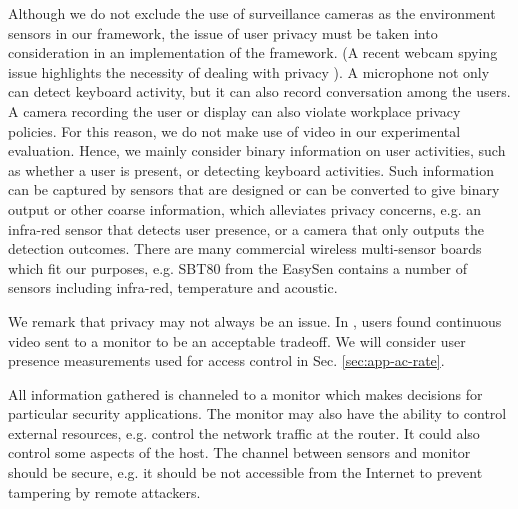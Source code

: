 Although we do not exclude the use of surveillance cameras as the
environment sensors in our framework, the issue of user privacy must
be taken into consideration in an implementation of the framework.
(A recent webcam spying issue highlights the necessity of dealing
with privacy \cite{webcam-spying}).
A microphone not only can detect keyboard activity, but it can also
record conversation among the users. A camera recording the user or
display can also violate workplace privacy policies.
For this reason,
we do not make use of video in our experimental evaluation.
Hence, we mainly consider binary information on user activities, such as
whether a user is present, or detecting keyboard activities.
Such
information can be captured by sensors that are designed or can be converted to give
binary output or other coarse information, which alleviates privacy
concerns, e.g. an infra-red sensor that detects user presence, or a
camera that only outputs the detection outcomes.
There are many commercial wireless multi-sensor
boards which fit our purposes, e.g.
SBT80 from the EasySen
\cite{EasySen} contains a number of sensors including infra-red,
temperature and acoustic.

We remark that privacy may not always be an issue.
In \cite{biomon2}, users found continuous video sent to a monitor to
be an acceptable tradeoff.
We will consider user presence measurements
used for access control in Sec. \ref{sec:app-ac-rate}.

All information gathered is channeled to a
monitor which makes decisions for particular security applications.
The monitor may also have the ability to control
external resources, e.g. control the network traffic at the router.
It could also control some aspects of the host.
The channel between sensors and monitor should be secure,
e.g. it should be not accessible from the Internet to prevent 
tampering by remote attackers. 

